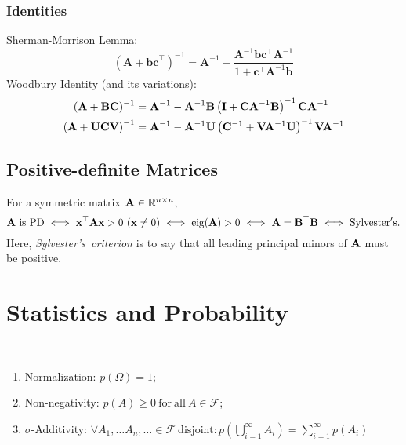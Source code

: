 \subsubsection{Identities}
Sherman-Morrison Lemma:
\begin{equation}
\left(\mathbf{A}+\mathbf{b c}^{\top}\right)^{-1}=\mathbf{A}^{-1}-\frac{\mathbf{A}^{-1} \mathbf{b} \mathbf{c}^{\top} \mathbf{A}^{-1}}{1+\mathbf{c}^{\top} \mathbf{A}^{-1} \mathbf{b}}
\end{equation}
Woodbury Identity (and its variations):
\begin{align}
(\mathbf{A}+\mathbf{B C})^{-1} & =\mathbf{A}^{-1}-\mathbf{A}^{-1} \mathbf{B}\left(\mathbf{I}+\mathbf{C A}^{-1} \mathbf{B}\right)^{-1} \mathbf{C A}^{-1} \\
\left(\mathbf{A}+\mathbf{U} \mathbf{C} \mathbf{V}\right)^{-1} & =\mathbf{A}^{-1}-\mathbf{A}^{-1}\mathbf{U}\left(\mathbf{C}^{-1}+\mathbf{V} \mathbf{A}^{-1} \mathbf{U}\right)^{-1}\mathbf{V} \mathbf{A}^{-1}
\end{align}
\subsection{Positive-definite Matrices}
For a symmetric matrix $\mathbf{A} \in \mathbb{R}^{n \times n}$, 
\begin{equation}
	\bfA \mathrm{\ is\ PD}\ \Longleftrightarrow\ \bfx^\top \bfA \bfx > 0\ (\bfx \neq 0)\ \Longleftrightarrow\ \mathrm{eig}(\bfA) > 0\ \Longleftrightarrow \ \bfA = \bfB^\top \bfB \ \Longleftrightarrow \ \mathrm{ Sylvester's}.
\end{equation}
Here, \textit{Sylvester's\ criterion} is to say that all leading principal minors of $\mathbf{A}$ must be positive.

\section{Statistics and Probability}
\begin{property}
\ 
\begin{enumerate}
	\item Normalization:  $p(\Omega) = 1$;
 	\item Non-negativity: $p(A) \geq 0 \ \mathrm{ for\ all }\ A \in \mathcal{F}$;
	\item $\sigma$-Additivity: $ \displaystyle \forall A_{1}, \ldots A_{n}, \ldots \in \mathcal{F} \ \mathrm{disjoint}: p\left(\bigcup_{i=1}^{\infty} A_{i}\right)=\sum_{i=1}^{\infty} p\left(A_{i}\right)$
\end{enumerate}
	\end{property}

